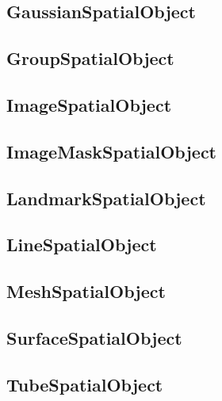 \subsection{GaussianSpatialObject}
\label{sec:GaussianSpatialObject}



\subsection{GroupSpatialObject}
\label{sec:GroupSpatialObject}




\subsection{ImageSpatialObject}
\label{sec:ImageSpatialObject}



\subsection{ImageMaskSpatialObject}
\label{sec:ImageMaskSpatialObject}



\subsection{LandmarkSpatialObject}
\label{sec:LandmarkSpatialObject}



\subsection{LineSpatialObject}
\label{sec:LineSpatialObject}



\subsection{MeshSpatialObject}
\label{sec:MeshSpatialObject}



\subsection{SurfaceSpatialObject}
\label{sec:SurfaceSpatialObject}



\subsection{TubeSpatialObject}

